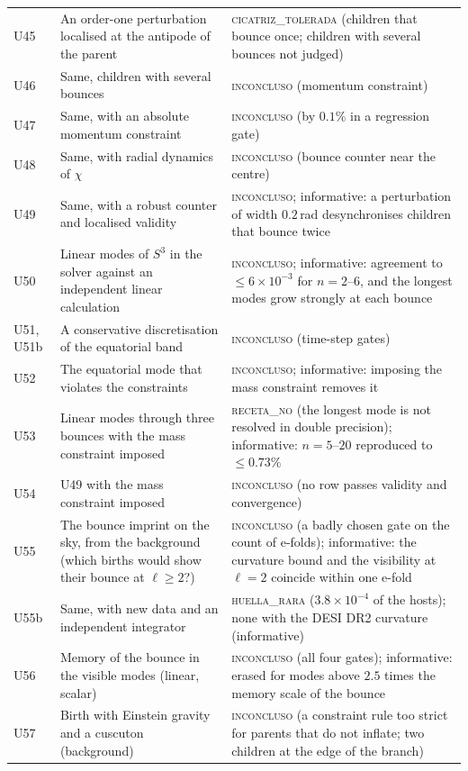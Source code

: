 \documentclass[11pt,a4paper]{article}
\begin{document}
\begin{small}
\begin{longtable}{L{1.3cm}L{6.0cm}L{7.6cm}}
U45 & An order-one perturbation localised at the antipode of the parent & \textsc{cicatriz\_tolerada} (children that bounce once; children with several bounces not judged) \\
U46 & Same, children with several bounces & \textsc{inconcluso} (momentum constraint) \\
U47 & Same, with an absolute momentum constraint & \textsc{inconcluso} (by $0.1\%$ in a regression gate) \\
U48 & Same, with radial dynamics of $\chi$ & \textsc{inconcluso} (bounce counter near the centre) \\
U49 & Same, with a robust counter and localised validity & \textsc{inconcluso}; informative: a perturbation of width $0.2$\,rad desynchronises children that bounce twice \\
U50 & Linear modes of $S^3$ in the solver against an independent linear calculation & \textsc{inconcluso}; informative: agreement to $\le6\times10^{-3}$ for $n=2$--$6$, and the longest modes grow strongly at each bounce \\
U51, U51b & A conservative discretisation of the equatorial band & \textsc{inconcluso} (time-step gates) \\
U52 & The equatorial mode that violates the constraints & \textsc{inconcluso}; informative: imposing the mass constraint removes it \\
U53 & Linear modes through three bounces with the mass constraint imposed & \textsc{receta\_no} (the longest mode is not resolved in double precision); informative: $n=5$--$20$ reproduced to $\le0.73\%$ \\
U54 & U49 with the mass constraint imposed & \textsc{inconcluso} (no row passes validity and convergence) \\
U55 & The bounce imprint on the sky, from the background (which births would show their bounce at $\ell\ge2$?) & \textsc{inconcluso} (a badly chosen gate on the count of e-folds); informative: the curvature bound and the visibility at $\ell=2$ coincide within one e-fold \\
U55b & Same, with new data and an independent integrator & \textsc{huella\_rara} ($3.8\times10^{-4}$ of the hosts); none with the DESI DR2 curvature (informative) \\
U56 & Memory of the bounce in the visible modes (linear, scalar) & \textsc{inconcluso} (all four gates); informative: erased for modes above $2.5$ times the memory scale of the bounce \\
U57 & Birth with Einstein gravity and a cuscuton (background) & \textsc{inconcluso} (a constraint rule too strict for parents that do not inflate; two children at the edge of the branch) \\

\end{longtable}
\end{small}
\end{document}
